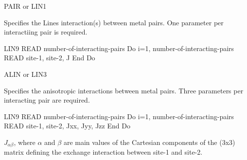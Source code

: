\begin{keywordlist}
\item[PAIR or LIN1]

Specifies the Lines interaction(s) between metal pairs. One parameter per interactiing pair is required.
\begin{sourcelisting}
LIN9
   READ number-of-interacting-pairs
   Do i=1, number-of-interacting-pairs
      READ site-1, site-2,   J
   End Do
\end{sourcelisting}


\item[ALIN or LIN3]

Specifies the anisotropic interactions between metal pairs. Three parameters per interacting pair are required.

\begin{sourcelisting}
LIN9
   READ number-of-interacting-pairs
   Do i=1, number-of-interacting-pairs
      READ site-1, site-2,   Jxx, Jyy, Jzz
   End Do
\end{sourcelisting}
$J_{\alpha\beta}$, where $\alpha$ and $\beta$ are main values of the Cartesian components of the (3x3) matrix defining the exchange interaction between site-1 and site-2.



\end{keywordlist}
